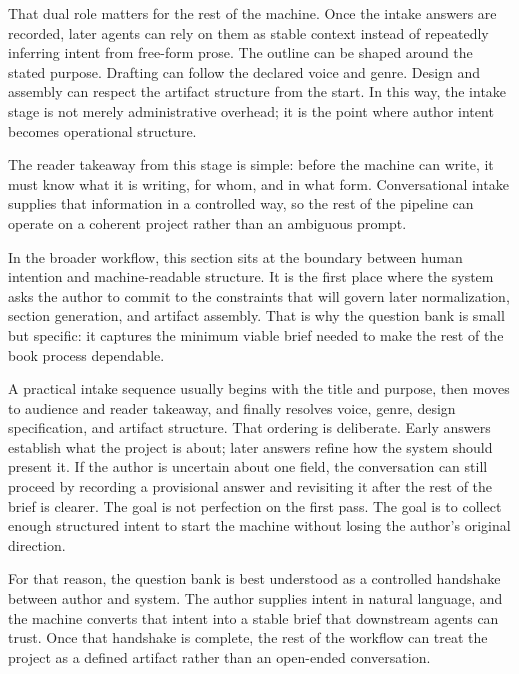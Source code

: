 That dual role matters for the rest of the machine. Once the intake answers are recorded, later agents can rely on them as stable context instead of repeatedly inferring intent from free-form prose. The outline can be shaped around the stated purpose. Drafting can follow the declared voice and genre. Design and assembly can respect the artifact structure from the start. In this way, the intake stage is not merely administrative overhead; it is the point where author intent becomes operational structure.

The reader takeaway from this stage is simple: before the machine can write, it must know what it is writing, for whom, and in what form. Conversational intake supplies that information in a controlled way, so the rest of the pipeline can operate on a coherent project rather than an ambiguous prompt.

In the broader workflow, this section sits at the boundary between human intention and machine-readable structure. It is the first place where the system asks the author to commit to the constraints that will govern later normalization, section generation, and artifact assembly. That is why the question bank is small but specific: it captures the minimum viable brief needed to make the rest of the book process dependable.

A practical intake sequence usually begins with the title and purpose, then moves to audience and reader takeaway, and finally resolves voice, genre, design specification, and artifact structure. That ordering is deliberate. Early answers establish what the project is about; later answers refine how the system should present it. If the author is uncertain about one field, the conversation can still proceed by recording a provisional answer and revisiting it after the rest of the brief is clearer. The goal is not perfection on the first pass. The goal is to collect enough structured intent to start the machine without losing the author's original direction.

For that reason, the question bank is best understood as a controlled handshake between author and system. The author supplies intent in natural language, and the machine converts that intent into a stable brief that downstream agents can trust. Once that handshake is complete, the rest of the workflow can treat the project as a defined artifact rather than an open-ended conversation.
